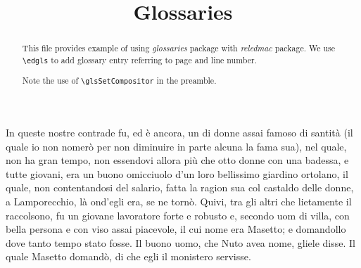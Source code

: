 \documentclass{article}
\begin{document}
\begin{english}
\title{Glossaries}
\date{}
\maketitle
\begin{abstract}
This file provides example of using \emph{glossaries} package with \emph{reledmac} package.
We use \verb+\edgls+ to add glossary entry referring to page and line number.

Note the use of \verb+\glsSetCompositor+ in the preamble.
\end{abstract}

\end{english}

\beginnumbering
\pstart
In queste nostre contrade fu, ed è ancora, un  di donne assai famoso di santità 
(il quale io non nomerò per non diminuire in parte alcuna la fama sua), nel quale, non ha gran 
tempo, non essendovi allora più che otto donne con una badessa, e tutte giovani, era un buono 
omicciuolo d'un loro bellissimo giardino ortolano, il quale, non contentandosi del salario, fatta la 
ragion sua col castaldo delle donne, a Lamporecchio, là ond'egli era, se ne tornò. Quivi, tra gli 
altri che lietamente il raccolsono, fu un giovane lavoratore forte e robusto e, secondo uom di villa, 
con bella persona e con viso assai piacevole, il cui nome era Masetto; e 
domandollo dove tanto tempo stato fosse. Il buono uomo, che Nuto avea nome, 
gliele disse. Il quale Masetto domandò, di che egli il monistero servisse. 
\pend
\endnumbering
\printglossaries
\end{document}

